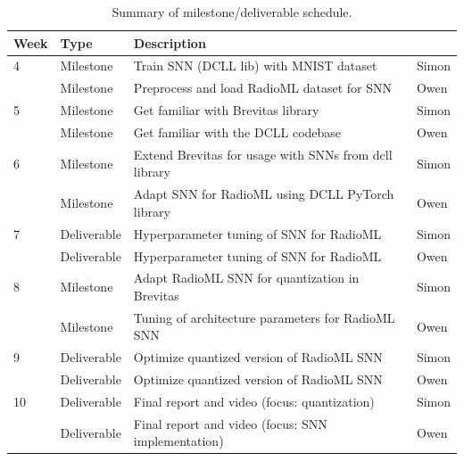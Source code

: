 \documentclass[parskip=true, 10pt]{scrartcl}
\begin{document}
\begin{table}[H]
\begin{tabularx}{\textwidth}{llm{9cm}l}
\toprule
\textbf{\textsf{Week}}    & \textbf{\textsf{Type}}            & \textbf{\textsf{Description}}                                                                             & \textbf{\textsf{}} \\
\midrule
4  & Milestone   & Train SNN (DCLL lib) with MNIST dataset                       & Simon          \\
        & Milestone   & Preprocess and load RadioML dataset for SNN                     & Owen           \\
\midrule
5  & Milestone   & Get familiar with Brevitas library                                                       & Simon          \\
        & Milestone   & Get familiar with the DCLL codebase                             & Owen           \\
\midrule
6  & Milestone & Extend Brevitas for usage with SNNs from dcll library & Simon          \\
        & Milestone & Adapt SNN for RadioML using DCLL PyTorch library                 & Owen           \\
\midrule
7  & Deliverable   & Hyperparameter tuning of SNN for RadioML                         & Simon          \\
        & Deliverable   & Hyperparameter tuning of SNN for RadioML                         & Owen           \\
\midrule
8  & Milestone   & Adapt RadioML SNN for quantization in Brevitas                                                                   & Simon          \\
        & Milestone   & Tuning of architecture parameters for RadioML SNN                                                                   & Owen           \\
\midrule
9  & Deliverable & Optimize quantized version of RadioML SNN                                               & Simon          \\
        & Deliverable & Optimize quantized version of RadioML SNN                                           & Owen           \\
\midrule
10 & Deliverable & Final report and video (focus: quantization)                                    & Simon          \\
        & Deliverable & Final report and video (focus: SNN implementation)                              & Owen    \\
\bottomrule
\end{tabularx}
\caption{Summary of milestone/deliverable schedule.}
\label{milestone_summary}
\end{table}
\end{document}

